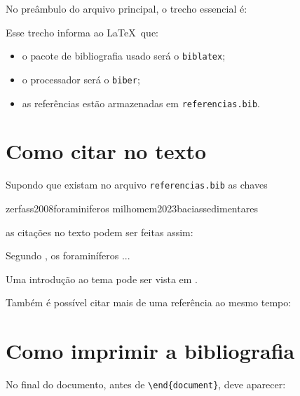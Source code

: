 \documentclass[12pt,a4paper]{article}
\newcommand{\arquivo}[1]{\texttt{#1}}
\newcommand{\comando}[1]{\texttt{#1}}
\begin{document}
No preâmbulo do arquivo principal, o trecho essencial é:

\begin{bloco}
\usepackage[
    backend=biber,
    style=authoryear,
    sorting=nyt
]{biblatex}


\end{bloco}

Esse trecho informa ao \LaTeX\ que:

\begin{itemize}[leftmargin=1.5cm]
    \item o pacote de bibliografia usado será o \texttt{biblatex};
    \item o processador será o \texttt{biber};
    \item as referências estão armazenadas em \arquivo{referencias.bib}.
\end{itemize}

\section{Como citar no texto}

Supondo que existam no arquivo \arquivo{referencias.bib} as chaves

\begin{bloco}
zerfass2008foraminiferos
milhomem2023baciassedimentares
\end{bloco}

as citações no texto podem ser feitas assim:

\begin{bloco}
Segundo \cite{zerfass2008foraminiferos}, os foraminíferos ...

Uma introdução ao tema pode ser vista em \cite{milhomem2023baciassedimentares}.
\end{bloco}

Também é possível citar mais de uma referência ao mesmo tempo:

\begin{bloco}
\cite{zerfass2008foraminiferos,milhomem2023baciassedimentares}
\end{bloco}

\section{Como imprimir a bibliografia}

No final do documento, antes de \comando{\textbackslash end\{document\}}, deve aparecer:

\begin{bloco}
\printbibliography
\end{bloco}
\end{document}
